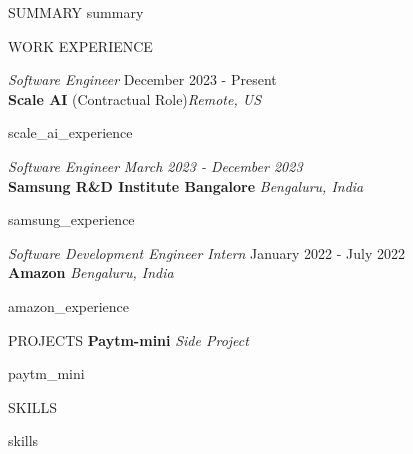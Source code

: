 \documentclass{resume}
\begin{document}
\begin{rSection}{SUMMARY}
 \vspace{-2pt}
    {{ summary }}
\end{rSection}

\vspace{-5pt}
\begin{rSection}{WORK EXPERIENCE}

    \textit{Software Engineer} \hfill December 2023 - Present\\
    \textbf{Scale AI} (Contractual Role)\hfill \textit{Remote, US}
    \begin{itemize}
        \vspace{-1pt}
        \itemsep -3pt {}
        {{ scale_ai_experience }}
    \end{itemize}

    \textit{Software Engineer} \hfill \textit{March 2023 - December 2023} \\
    \textbf{Samsung R\&D Institute Bangalore} \hfill \textit{Bengaluru, India}
    \begin{itemize}
        \vspace{-1pt}
        \itemsep -3pt {}
        {{ samsung_experience }}
    \end{itemize}

    \textit{Software Development Engineer Intern} \hfill January 2022 - July 2022\\
    \textbf{Amazon} \hfill \textit{Bengaluru, India}
    \begin{itemize}
        \vspace{-1pt}
        \itemsep -3pt {}
        {{ amazon_experience }}
    \end{itemize}

\end{rSection}

\begin{rSection}{PROJECTS}
    \textbf{Paytm-mini} \hfill \textit{Side Project}
    \begin{itemize}
        \vspace{-1pt}
        \itemsep -3pt {}
        {{ paytm_mini }}
    \end{itemize}
\end{rSection}

\begin{rSection}{SKILLS}
    \begin{itemize}
        \itemsep -3pt {}
        {{ skills }}
    \end{itemize}
\end{rSection}
\end{document}
